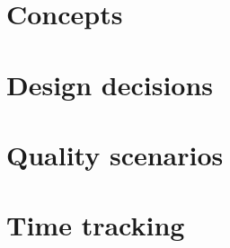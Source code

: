 \documentclass[11pt, oneside]{book}
\begin{document}
\chapter{Concepts}
\label{chp:concepts}


\chapter{Design decisions}
\label{chp:design_decisions}


\chapter{Quality scenarios}
\label{chp:quality_scenarios}


\listoftodos[Notes]

\appendix

\chapter{Time tracking}
\label{chp:time_track}


\backmatter

\printbibliography
\end{document}
